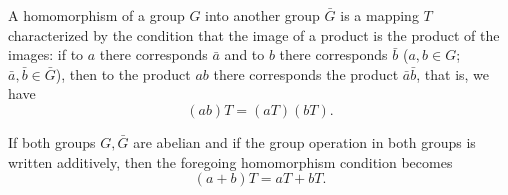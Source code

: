 A homomorphism of a group $G$ into another group $\bar{G}$ is a mapping $T$ characterized by the condition that the image of a product is the product of the images: if to $a$ there corresponds $\bar{a}$ and to $b$ there corresponds $\bar{b}$ ($a, b \in G$; $\bar{a}, \bar{b} \in \bar{G}$), then to the product $ab$ there corresponds the product $\bar{a}\bar{b}$, that is, we have
$$(ab)T = (aT)(bT).$$

If both groups $G, \bar{G}$ are abelian and if the group operation in both groups is written additively, then the foregoing homomorphism condition becomes
$$(a + b)T = aT + bT.$$
